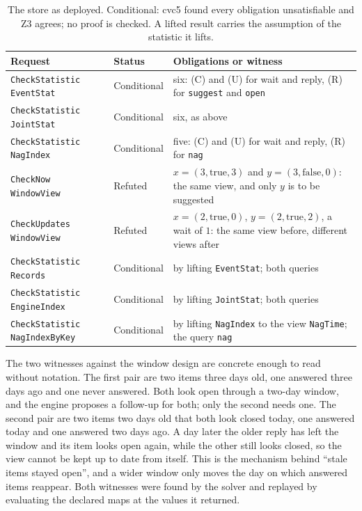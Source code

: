 \documentclass[11pt]{article}
\newcommand{\code}[1]{\texttt{#1}}
\theoremstyle{definition}
\theoremstyle{plain}
\begin{document}
\begin{table}[ht]
\centering\small
\begin{tabularx}{\textwidth}{>{\raggedright\arraybackslash}p{5.1cm}>{\raggedright\arraybackslash}p{1.95cm}>{\raggedright\arraybackslash}X}
\toprule
Request & Status & Obligations or witness\\
\midrule
\code{CheckStatistic EventStat} & Conditional & six: (C) and (U) for wait and reply, (R) for
\code{suggest} and \code{open}\\
\code{CheckStatistic JointStat} & Conditional & six, as above\\
\code{CheckStatistic NagIndex} & Conditional & five: (C) and (U) for wait and reply, (R) for
\code{nag}\\
\code{CheckNow WindowView} & Refuted & $x=(3,\mathrm{true},3)$ and $y=(3,\mathrm{false},0)$: the
same view, and only $y$ is to be suggested\\
\code{CheckUpdates WindowView} & Refuted & $x=(2,\mathrm{true},0)$, $y=(2,\mathrm{true},2)$, a
wait of $1$: the same view before, different views after\\
\code{CheckStatistic Records} & Conditional & by lifting \code{EventStat}; both queries\\
\code{CheckStatistic EngineIndex} & Conditional & by lifting \code{JointStat}; both queries\\
\code{CheckStatistic NagIndexByKey} & Conditional & by lifting \code{NagIndex} to the view
\code{NagTime}; the query \code{nag}\\
\bottomrule
\end{tabularx}
\caption{The store as deployed. Conditional: cvc5 found every obligation unsatisfiable and Z3
agrees; no proof is checked. A lifted result carries the assumption of the statistic it
lifts.}\label{tab:store}
\end{table}

The two witnesses against the window design are concrete enough to read without notation. The
first pair are two items three days old, one answered three days ago and one never answered. Both
look open through a two-day window, and the engine proposes a follow-up for both; only the second
needs one. The second pair are two items two days old that both look closed today, one answered
today and one answered two days ago. A day later the older reply has left the window and its item
looks open again, while the other still looks closed, so the view cannot be kept up to date from
itself. This is the mechanism behind ``stale items stayed open'', and a wider window only moves the
day on which answered items reappear. Both witnesses were found by the solver and replayed by
evaluating the declared maps at the values it returned.
\end{document}
